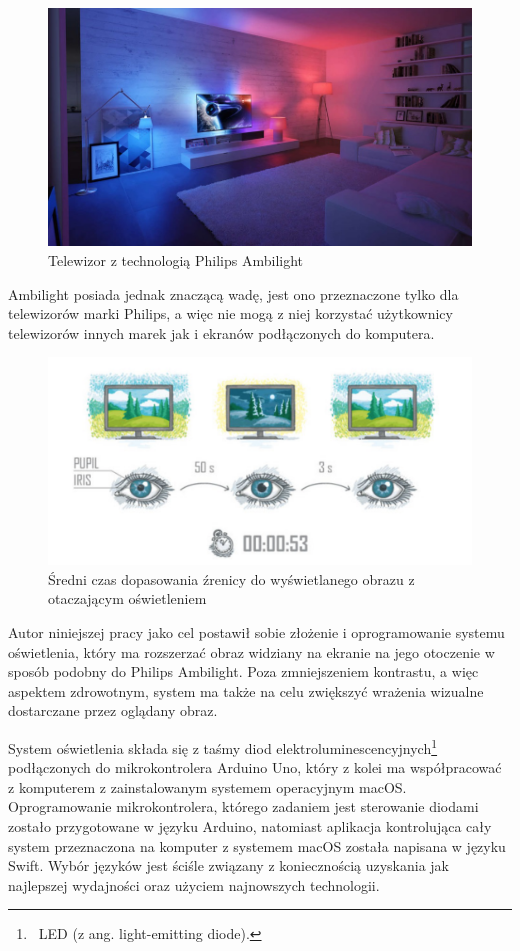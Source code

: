 \documentclass[12pt]{report}
\begin{document}
\begin{figure}[h]
\centering
\includegraphics[width=\textwidth]{../resources/ambilight3.jpg}
\caption[Telewizor z technologią Philips Ambilight]{Telewizor z technologią Philips Ambilight \cite{ambilight2}}
\end{figure}

Ambilight posiada jednak znaczącą wadę, jest ono przeznaczone tylko dla telewizorów marki Philips, a więc nie mogą z niej korzystać użytkownicy telewizorów innych marek jak i ekranów podłączonych do komputera.

\begin{figure}[h]
\centering
\includegraphics[width=.7\textwidth]{../resources/focusw.png}
\caption[Średni czas dopasowania źrenicy do wyświetlanego obrazu z otaczającym oświetleniem]{Średni czas dopasowania źrenicy do wyświetlanego obrazu z otaczającym oświetleniem \cite{diagramoko}}
\end{figure}

Autor niniejszej pracy jako cel postawił sobie złożenie i oprogramowanie systemu oświetlenia, który ma rozszerzać obraz widziany na ekranie na jego otoczenie w sposób podobny do Philips Ambilight. Poza zmniejszeniem kontrastu, a więc aspektem zdrowotnym, system ma także na celu zwiększyć wrażenia wizualne dostarczane przez oglądany obraz.

System oświetlenia składa się z taśmy diod elektroluminescencyjnych\footnote{~LED (z ang. light-emitting diode).} pod\-łączonych do mikrokontrolera Arduino Uno, który z kolei ma współpracować z komputerem z zainstalowanym systemem operacyjnym macOS. Oprogramowanie mikrokontrolera, którego zadaniem jest sterowanie diodami zostało przygotowane w języku Arduino, natomiast aplikacja kontrolująca cały system przeznaczona na komputer z systemem macOS została napisana w języku Swift. Wybór języków jest ściśle związany z koniecznością uzyskania jak najlepszej wydajności oraz użyciem najnowszych technologii.
\end{document}
